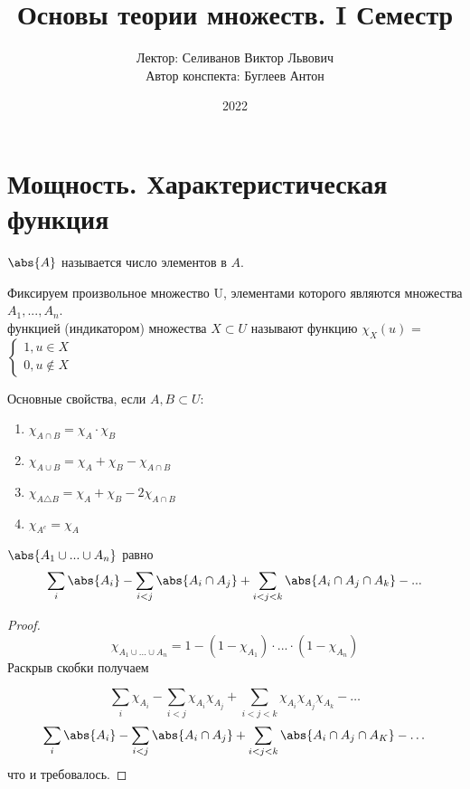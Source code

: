 \documentclass[a4paper, 14pt]{article}
\title{Основы теории множеств. I Семестр}
\author{Лектор: Селиванов Виктор Львович \\
        Автор конспекта: Буглеев Антон}
\date{2022}
\begin{document}
    \maketitle
    \newpage

    \section{Мощность. Характеристическая функция}

    \begin{definition}
        {} $\abs{A}$ называется число элементов в $A$.
    \end{definition}

    \begin{definition}
        Фиксируем произвольное множество U, элементами которого являются множества
        $A_1, ..., A_n$. \\
        { функцией (индикатором)} множества $X \subset U$ называют
        функцию $\chi_X(u)$ = 
        $\begin{cases} 
            1, u \in X \\
            0, u \notin X
        \end{cases}$
    \end{definition}

    Основные свойства, если $A, B \subset U$:
    \begin{enumerate}
        \item $\chi_{A \cap B} = \chi_A \cdot \chi_B$
        \item $\chi_{A\cup B} = \chi_A + \chi_B - \chi_{A \cap B}$
        \item $\chi_{A\triangle B} = \chi_A + \chi_B - 2\chi_{A \cap B}$
        \item $\chi_{A^c} = \chi_A$
    \end{enumerate}

    \begin{theorem} $\abs{A_1 \cup ... \cup A_n}$ равно
        \[
        \sum_{i} \abs{A_i} - 
        \sum_{i<j} \abs{A_i \cap A_j} + 
        \sum_{i<j<k} \abs{A_i \cap A_j \cap A_k} - ...
        \]
    \end{theorem}
    \begin{proof}[Proof]
        \[ \chi_{A_1 \cup ... \cup A_n} = 1 - (1 - \chi_{A_1}) \cdot ... \cdot (1 - \chi_{A_n}) \]
        Раскрыв скобки получаем

        \[
            \sum_{i} \chi_{A_i} -
            \sum_{i < j} \chi_{A_i}\chi_{A_j} +
            \sum_{i < j < k} \chi_{A_i}\chi_{A_j}\chi_{A_k}  - \dots  
        \]
        \[ 
        \sum_{i} \abs{A_i} -
        \sum_{i<j}  \abs{A_i \cap A_j} +
        \sum_{i<j<k} \abs{A_i \cap A_j \cap A_K} - \dots
        \] что и требовалось.
    \end{proof}
\end{document}
